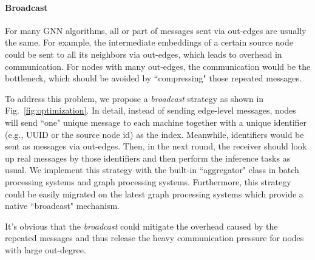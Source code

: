 \documentclass[conference]{IEEEtran}
\begin{document}

\paragraph{\textbf{Broadcast}} 
For many GNN algorithms, all or part of messages sent via out-edges are usually the same. 
For example, the intermediate embeddings of a certain source node could be sent to all its neighbors via out-edges, which leads to overhead in communication.
For nodes with many out-edges, the communication would be the bottleneck, which should be avoided by ``compressing" those repeated messages.

To address this problem, we propose a \emph{broadcast} strategy as shown in Fig.~\ref{fig:optimization}.
In detail, instead of sending edge-level messages, nodes will send ``one" unique message to each machine together with a unique identifier (e.g., UUID or the source node id) as the index.
Meanwhile, identifiers would be sent as messages via out-edges.
Then, in the next round, the receiver should look up real messages by those identifiers and then perform the inference tasks as usual.
We implement this strategy with the built-in ``aggregator" class in batch processing systems and graph processing systems.
Furthermore, this strategy could be easily migrated on the latest graph processing systems which provide a native ``broadcast" mechanism.

It's obvious that the \emph{broadcast} could mitigate the overhead caused by the repeated messages and thus release the heavy communication pressure for nodes with large out-degree.
\end{document}
